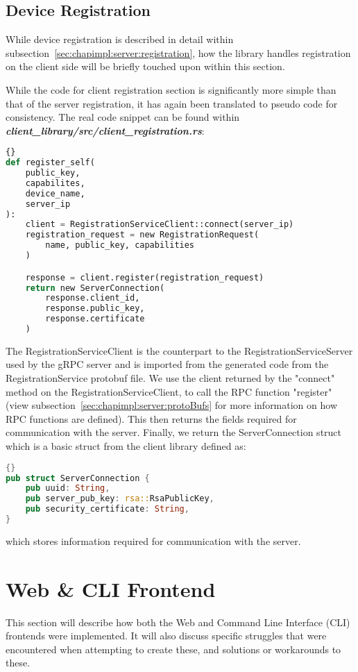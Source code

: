 \subsection{Device Registration} \label{sec:chapimpl:devicelib:registration}
While device registration is described in detail within subsection~\ref{sec:chapimpl:server:registration}, how the library handles registration on the client side will be briefly touched upon within this section.

While the code for client registration section is significantly more simple than that of the server registration, it has again been translated to pseudo code for consistency. The real code snippet can be found within \textit{\textbf{client\_library/src/client\_registration.rs}}: 
\begin{lstlisting}[language=Python, style=boxed, showstringspaces=false]{}
def register_self(
    public_key,
    capabilites,
    device_name,
    server_ip
):
    client = RegistrationServiceClient::connect(server_ip)
    registration_request = new RegistrationRequest(
        name, public_key, capabilities
    )

    response = client.register(registration_request)
    return new ServerConnection(
        response.client_id,
        response.public_key,
        response.certificate
    )
\end{lstlisting}
The RegistrationServiceClient is the counterpart to the RegistrationServiceServer used by the gRPC server and is imported from the generated code from the RegistrationService protobuf file. We use the client returned by the "connect" method on the RegistrationServiceClient, to call the RPC function "register" (view subsection~\ref{sec:chapimpl:server:protoBufs} for more information on how RPC functions are defined). This then returns the fields required for communication with the server. Finally, we return the ServerConnection struct which is a basic struct from the client library defined as:
\begin{lstlisting}[language=Rust, style=boxed, showstringspaces=false]{}
pub struct ServerConnection {
    pub uuid: String,
    pub server_pub_key: rsa::RsaPublicKey,
    pub security_certificate: String,
}
\end{lstlisting}
which stores information required for communication with the server. 

\section{Web \& CLI Frontend} \label{sec:chapimpl:frontend}
This section will describe how both the Web and Command Line Interface (CLI) frontends were implemented. It will also discuss specific struggles that were encountered when attempting to create these, and solutions or workarounds to these. 
